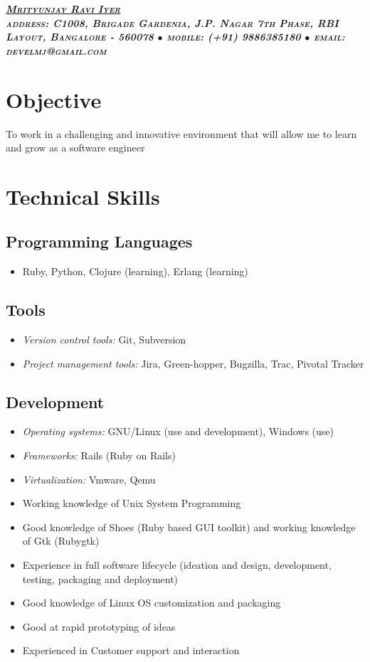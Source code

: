 \documentclass[a4paper,11pt]{article}
\begin{document}
\begin{center}{\Large{\textsc{\textsl{\bf{\underline{Mrityunjay Ravi
          Iyer}}\\\tiny{address: C1008, Brigade Gardenia, J.P. Nagar 7th Phase,
          RBI Layout, Bangalore - 560078 $\bullet$ mobile: (+91) 9886385180
          $\bullet$ email: develmj@gmail.com}}}}}
\end{center}
\section{Objective}
To work in a challenging and innovative environment that will allow me
to learn and grow as a software engineer

\section{Technical Skills}
\subsection{Programming Languages}
\begin{itemize}
  \item[] Ruby, Python, Clojure (learning), Erlang (learning)
\end{itemize}

\subsection{Tools}
\begin{itemize}
  \item[] \textsl{Version control tools:} Git, Subversion
  \item[] \textsl{Project management tools:} Jira, Green-hopper, Bugzilla, Trac,
    Pivotal Tracker
\end{itemize}

\subsection{Development}
\begin{itemize}
  \item[] \textsl{Operating systems:} GNU/Linux (use and development),
    Windows (use)
  \item[] \textsl{Frameworks:} Rails (Ruby on Rails)
  \item[] \textsl{Virtualization:} Vmware, Qemu
  \item[] Working knowledge of Unix System Programming
  \item[] Good knowledge of Shoes (Ruby based GUI toolkit) and working
    knowledge of Gtk (Rubygtk)
  \item[] Experience in full software lifecycle (ideation and design,
 development, testing, packaging and deployment)
  \item[] Good knowledge of Linux OS customization and packaging
  \item[] Good at rapid prototyping of ideas
  \item[] Experienced in Customer support and interaction
\end{itemize}
\end{document}
